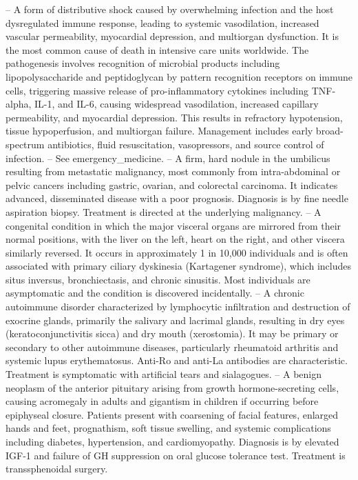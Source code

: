 -- A form of distributive shock caused by overwhelming infection and the host dysregulated immune response, leading to systemic vasodilation, increased vascular permeability, myocardial depression, and multiorgan dysfunction. It is the most common cause of death in intensive care units worldwide. The pathogenesis involves recognition of microbial products including lipopolysaccharide and peptidoglycan by pattern recognition receptors on immune cells, triggering massive release of pro-inflammatory cytokines including TNF-alpha, IL-1, and IL-6, causing widespread vasodilation, increased capillary permeability, and myocardial depression. This results in refractory hypotension, tissue hypoperfusion, and multiorgan failure. Management includes early broad-spectrum antibiotics, fluid resuscitation, vasopressors, and source control of infection.
-- See emergency\_medicine.
-- A firm, hard nodule in the umbilicus resulting from metastatic malignancy, most commonly from intra-abdominal or pelvic cancers including gastric, ovarian, and colorectal carcinoma. It indicates advanced, disseminated disease with a poor prognosis. Diagnosis is by fine needle aspiration biopsy. Treatment is directed at the underlying malignancy.
-- A congenital condition in which the major visceral organs are mirrored from their normal positions, with the liver on the left, heart on the right, and other viscera similarly reversed. It occurs in approximately 1 in 10,000 individuals and is often associated with primary ciliary dyskinesia (Kartagener syndrome), which includes situs inversus, bronchiectasis, and chronic sinusitis. Most individuals are asymptomatic and the condition is discovered incidentally.
-- A chronic autoimmune disorder characterized by lymphocytic infiltration and destruction of exocrine glands, primarily the salivary and lacrimal glands, resulting in dry eyes (keratoconjunctivitis sicca) and dry mouth (xerostomia). It may be primary or secondary to other autoimmune diseases, particularly rheumatoid arthritis and systemic lupus erythematosus. Anti-Ro and anti-La antibodies are characteristic. Treatment is symptomatic with artificial tears and sialagogues.
-- A benign neoplasm of the anterior pituitary arising from growth hormone-secreting cells, causing acromegaly in adults and gigantism in children if occurring before epiphyseal closure. Patients present with coarsening of facial features, enlarged hands and feet, prognathism, soft tissue swelling, and systemic complications including diabetes, hypertension, and cardiomyopathy. Diagnosis is by elevated IGF-1 and failure of GH suppression on oral glucose tolerance test. Treatment is transsphenoidal surgery.
